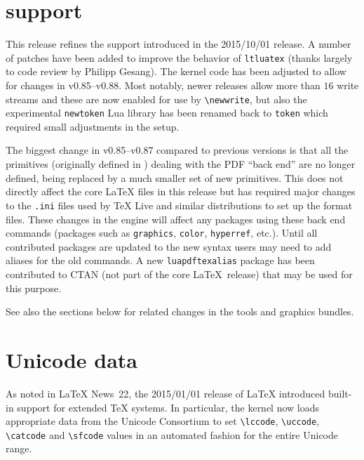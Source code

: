 \documentclass{ltnews}
\providecommand\pkg[1]{\texttt{#1}}
\begin{document}
\maketitle

\tableofcontents

\section{ support}

This release refines the  support introduced in the
2015/10/01 release. A number of patches have been added to improve the
behavior of \pkg{ltluatex} (thanks largely to code review by Philipp Gesang).
The kernel code has been adjusted to
allow for changes in  v0.85--v0.88. Most notably, newer
 releases allow more than $16$ write streams and these are now
enabled for use by \verb|\newwrite|, but also the experimental
\texttt{newtoken} Lua library has been renamed back to \texttt{token}
which required small adjustments in the   setup.

The biggest change in   v0.85--v0.87 compared to previous
versions is that all the primitives (originally defined in
) dealing with the PDF ``back end''
are no longer defined, being replaced by a much smaller set of new primitives.
This does not directly affect the core \LaTeX{}
files in this release but has required major changes to the
\texttt{.ini} files used by \TeX{} Live and similar distributions to
set up the format files. These changes in the   engine
will affect any packages using these back end commands (packages such
as \pkg{graphics},  \pkg{color},  \pkg{hyperref}, etc.).
Until all contributed packages are updated to the new syntax users may
need to add aliases for the old  commands. A new
\pkg{luapdftexalias} package has been contributed to CTAN (not part of the
core \LaTeX\ release) that may be used for this purpose.

See also the sections below for related changes in the
\textsf{tools} and \textsf{graphics} bundles.


\section{Unicode data}

As noted in \LaTeX{} News~22, the 2015/01/01 release of \LaTeX{} introduced
built-in support for extended \TeX{} systems. In particular, the kernel now
loads appropriate data from the Unicode Consortium to set \verb|\lccode|,
\verb|\uccode|, \verb|\catcode| and \verb|\sfcode| values in an automated
fashion for the entire Unicode range.
\end{document}
